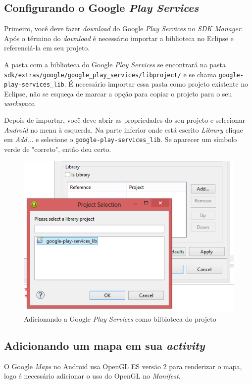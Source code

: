 \documentclass[a4paper,12pt,brazil]{book}
\begin{document}
\begin{singlespace}
		\subsection{Configurando o Google  \emph{Play Services}}

		Primeiro, você deve fazer \emph{download} do Google \emph{Play Services} no \emph{SDK Manager}. Após o término do \emph{download} é necessário importar a biblioteca no Eclipse e referenciá-la em seu projeto. 
		
		A pasta com a biblioteca do Google \emph{Play Services} se encontrará na pasta \texttt{sdk/extras/google/google\_play\_services/libproject/} e se chama \texttt{google-play-services\_lib}. É necessário importar essa pasta como projeto existente no Eclipse, não se esqueça de marcar a opção para copiar o projeto para o seu \emph{workspace}. 

		Depois de importar, você deve abrir as propriedades do seu projeto e selecionar \emph{Android} no menu à esquerda. Na parte inferior onde está escrito \emph{Library} clique em \emph{Add...} e selecione o \texttt{google-play-services\_lib}. Se aparecer um símbolo verde de "correto", então deu certo.

		\begin{figure}[H]
		  \centering
		  \includegraphics[width=.8\textwidth]{figuras/api/localizacao/playlib.png}
		  \caption{Adicionando a Google \emph{Play Services} como bilbioteca do projeto}
		  \label{fig:apiplaylib}
		\end{figure}

		\subsection{Adicionando um mapa em sua \emph{activity}}

		O Google \emph{Maps} no Android usa OpenGL ES versão 2 para renderizar o mapa, logo é necessário adicionar o uso do OpenGL no \emph{Manifest}.


\end{singlespace}
\end{document}

